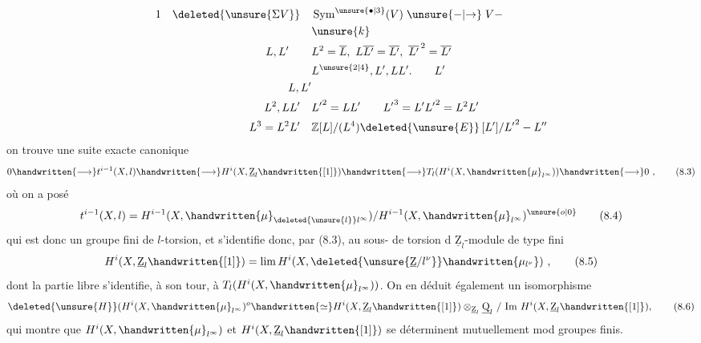 \[
\begin{aligned}
1\quad\deleted{\unsure{\Sigma V}}\quad &\operatorname{Sym}^{\unsure{\bullet|3}}(V)\; \unsure{-|{\to}}\;V-\\
&\unsure{k}\\
L,L'\qquad &L^2=\overline L,\ L\overline{L'}=\overline{L'},\ \overline{L'}^{\,2}=\overline{L'}\\
& L^{\unsure{2|4}},L',LL'.\qquad L'\\
L,L'&\\
L^2,LL'\quad & {L'}^{2}=LL'\qquad {L'}^{3}=L'{L'}^{2}=L^2L'\\
L^3=L^2L'\quad &\mathbb Z[L]/(L^4)\deleted{\unsure{E}}\,[L']/{L'}^{2}-L^{\prime\prime}
\end{aligned}
\]
on trouve une suite exacte canonique 
\[
0\handwritten{\longrightarrow}t^{i-1}(X,l)\handwritten{\longrightarrow}H^i(X,\underline{\mathrm Z}_l\handwritten{[1]})\handwritten{\longrightarrow}T_l(H^i(X,\handwritten{\mu}_{l^\infty}))\handwritten{\longrightarrow}0\ , \tag*{(8.3)}
\]
où  on a posé
\[
t^{i-1}(X,l)=H^{i-1}(X,\handwritten{\mu}_{\deleted{\unsure{l}}l^\infty})/H^{i-1}(X,\handwritten{\mu}_{l^\infty})^{\unsure{o|0}} \tag*{(8.4)}
\]
qui est donc un groupe fini de $l$-torsion, et s'identifie donc, par (8.3), au sous- de torsion d $\underline{\mathrm Z}_l$-module de type fini
\[
H^i(X,\underline{\mathrm Z}_l\handwritten{[1]})=\lim H^i(X,\deleted{\unsure{\underline{\mathrm Z}/l^\nu}}\handwritten{\mu_{l^\nu}})\ , \tag*{(8.5)}
\]
dont la partie libre s'identifie, à son tour, à $T_l(H^i(X,\handwritten{\mu}_{l^\infty}))$. On en \margin{\handwritten{!}}déduit également un isomorphisme
\[
\deleted{\unsure{H}}(H^i(X,\handwritten{\mu}_{l^\infty})^o\handwritten{\simeq} H^i(X,\underline{\mathrm Z}_l\handwritten{[1]})\otimes_{\underline{\mathrm Z}_l}\underline{\mathrm Q}_l\ /\ \mathrm{Im}\ H^i(X,\underline{\mathrm Z}_l\handwritten{[1]}), \tag*{(8.6)}
\]
qui montre que $H^i(X,\handwritten{\mu}_{l^\infty})$ et $H^i(X,\underline{\mathrm Z}_l\handwritten{[1]})$ se déterminent mutuellement mod groupes  finis.

